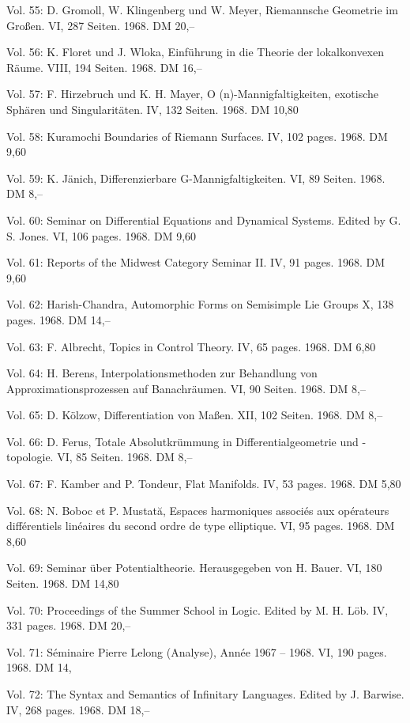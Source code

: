 Vol. 55: D. Gromoll, W. Klingenberg und W. Meyer, Riemannsche Geometrie im Großen. VI, 287 Seiten. 1968. DM 20,--

Vol. 56: K. Floret und J. Wloka, Einführung in die Theorie der lokalkonvexen Räume. VIII, 194 Seiten. 1968. DM 16,--

Vol. 57: F. Hirzebruch und K. H. Mayer, O (n)-Mannigfaltigkeiten, exotische Sphären und Singularitäten. IV, 132 Seiten. 1968. DM 10,80

Vol. 58: Kuramochi Boundaries of Riemann Surfaces. IV, 102 pages. 1968. DM 9,60

Vol. 59: K. Jänich, Differenzierbare G-Mannigfaltigkeiten. VI, 89 Seiten. 1968. DM 8,--

Vol. 60: Seminar on Differential Equations and Dynamical Systems. Edited by G. S. Jones. VI, 106 pages. 1968. DM 9,60

Vol. 61: Reports of the Midwest Category Seminar II. IV, 91 pages. 1968. DM 9,60

Vol. 62: Harish-Chandra, Automorphic Forms on Semisimple Lie Groups X, 138 pages. 1968. DM 14,--

Vol. 63: F. Albrecht, Topics in Control Theory. IV, 65 pages. 1968. DM 6,80

Vol. 64: H. Berens, Interpolationsmethoden zur Behandlung von Approximationsprozessen auf Banachräumen. VI, 90 Seiten. 1968. DM 8,--

Vol. 65: D. Kölzow, Differentiation von Maßen. XII, 102 Seiten. 1968. DM 8,--

Vol. 66: D. Ferus, Totale Absolutkrümmung in Differentialgeometrie und -topologie. VI, 85 Seiten. 1968. DM 8,--

Vol. 67: F. Kamber and P. Tondeur, Flat Manifolds. IV, 53 pages. 1968. DM 5,80

Vol. 68: N. Boboc et P. Mustată, Espaces harmoniques associés aux opérateurs différentiels linéaires du second ordre de type elliptique. VI, 95 pages. 1968. DM 8,60

Vol. 69: Seminar über Potentialtheorie. Herausgegeben von H. Bauer. VI, 180 Seiten. 1968. DM 14,80

Vol. 70: Proceedings of the Summer School in Logic. Edited by M. H. Löb. IV, 331 pages. 1968. DM 20,--

Vol. 71: Séminaire Pierre Lelong (Analyse), Année 1967 -- 1968. VI, 190 pages. 1968. DM 14,

Vol. 72: The Syntax and Semantics of Infinitary Languages. Edited by J. Barwise. IV, 268 pages. 1968. DM 18,--

